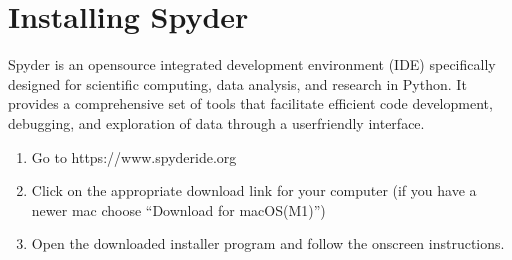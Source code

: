 \documentclass[letterpaper,10pt,english]{jupyterBook}
\begin{document}
\part{Installing Spyder}
\label{\detokenize{_pages/0.1_Installing_Python:installing-spyder}}
\sphinxAtStartPar
Spyder is an open\sphinxhyphen{}source integrated development environment (IDE) specifically designed for scientific computing, data analysis, and research in Python. It provides a comprehensive set of tools that facilitate efficient code development, debugging, and exploration of data through a user\sphinxhyphen{}friendly interface.
\begin{enumerate}
%
\item {} 
\sphinxAtStartPar
Go to https://www.spyder\sphinxhyphen{}ide.org

\item {} 
\sphinxAtStartPar
Click on the appropriate download link for your computer (if you have a newer mac choose “Download for macOS(M1)”)

\item {} 
\sphinxAtStartPar
Open the downloaded installer program and follow the onscreen instructions.

\end{enumerate}







\renewcommand{\indexname}{Index}
\printindex
\end{document}
